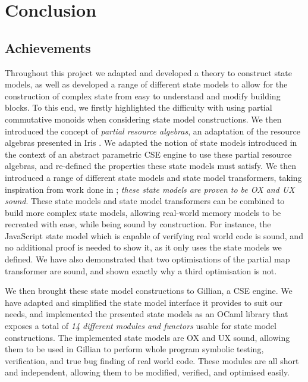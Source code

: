 \chapter{Conclusion} \label{chap:conclusion}

\section{Achievements}

Throughout this project we adapted and developed a theory to construct state models, as well as developed a range of different state models to allow for the construction of complex state from easy to understand and modify building blocks. To this end, we firstly highlighted the difficulty with using partial commutative monoids when considering state model constructions. We then introduced the concept of \emph{partial resource algebras}, an adaptation of the resource algebras presented in Iris \cite{iris}. We adapted the notion of state models introduced in the context of an abstract parametric CSE engine \cite{cse2} to use these partial resource algebras, and re-defined the properties these state models must satisfy. We then introduced a range of different state models and state model transformers, taking inspiration from work done in \cite{iris,sacha-phd}; \emph{these state models are proven to be OX and UX sound}. These state models and state model transformers can be combined to build more complex state models, allowing real-world memory models to be recreated with ease, while being sound by construction. For instance, the JavaScript state model which is capable of verifying real world code is sound, and no additional proof is needed to show it, as it only uses the state models we defined. We have also demonstrated that two optimisations of the partial map transformer are sound, and shown exactly why a third optimisation is not.

We then brought these state model constructions to Gillian, a CSE engine. We have adapted and simplified the state model interface it provides to suit our needs, and implemented the presented state models as an OCaml library that exposes a total of \emph{14 different modules and functors} usable for state model constructions. The implemented state models are OX and UX sound, allowing them to be used in Gillian to perform whole program symbolic testing, verification, and true bug finding of real world code. These modules are all short and independent, allowing them to be modified, verified, and optimised easily.


